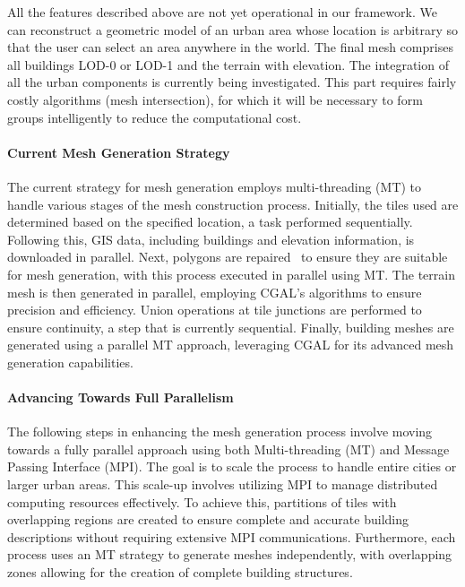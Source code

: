 \documentclass[runningheads]{llncs}
\begin{document}
All the features described above are not yet operational in our framework. We can reconstruct a geometric model of an urban area whose location is arbitrary so that the user can select an area anywhere in the world. The final mesh comprises all buildings LOD-0 or LOD-1 and the terrain with elevation. The integration of all the urban components is currently being investigated. This part requires fairly costly algorithms (mesh intersection), for which it will be necessary to form groups intelligently to reduce the computational cost.  

\paragraph{Current Mesh Generation Strategy}
The current strategy for mesh generation employs multi-threading (MT) to handle various stages of the mesh construction process. Initially, the tiles used are determined based on the specified location, a task performed sequentially. Following this, GIS data, including buildings and elevation information, is downloaded in parallel. Next, polygons are repaired~\cite{loriot_polygon_2024} to ensure they are suitable for mesh generation, with this process executed in parallel using MT. The terrain mesh is then generated in parallel, employing CGAL's algorithms to ensure precision and efficiency. Union operations at tile junctions are performed to ensure continuity, a step that is currently sequential. Finally, building meshes are generated using a parallel MT approach, leveraging CGAL for its advanced mesh generation capabilities.

\paragraph{Advancing Towards Full Parallelism}
The following steps in enhancing the mesh generation process involve moving towards a fully parallel approach using both Multi-threading (MT) and Message Passing Interface (MPI). The goal is to scale the process to handle entire cities or larger urban areas. This scale-up involves utilizing MPI to manage distributed computing resources effectively. To achieve this, partitions of tiles with overlapping regions are created to ensure complete and accurate building descriptions without requiring extensive MPI communications. Furthermore, each process uses an MT strategy to generate meshes independently, with overlapping zones allowing for the creation of complete building structures.
\end{document}
